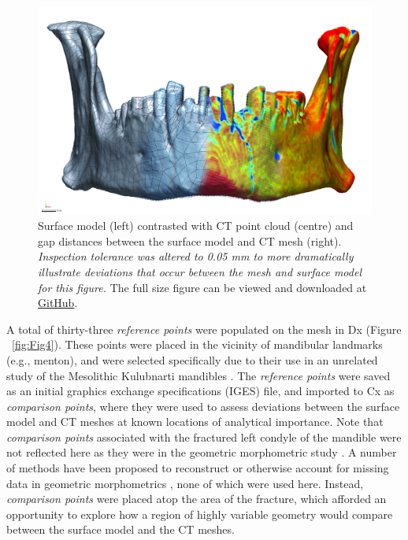 \documentclass[review]{elsarticle}
\begin{document}
\begin{figure}[ht]\centering
\includegraphics[width=\linewidth]{Fig2}
\caption{Surface model (left) contrasted with CT point cloud (centre) and gap distances between the surface model and CT mesh (right). \textit{Inspection tolerance was altered to 0.05 mm to more dramatically illustrate deviations that occur between the mesh and surface model for this figure.} The full size figure can be viewed and downloaded at \href{https://github.com/aksel-blaise/cai.mandible/blob/main/figures/Fig2.jpg}{GitHub}.}
\label{fig:Fig1x}
\end{figure}

A total of thirty-three \textit{reference points} were populated on the mesh in Dx (Figure ~\ref{fig:Fig4}). These points were placed in the vicinity of mandibular landmarks (e.g., menton), and were selected specifically due to their use in an unrelated study of the Mesolithic Kulubnarti mandibles \citep{RN11477}. The \textit{reference points} were saved as an initial graphics exchange specifications (IGES) file, and imported to Cx as \textit{comparison points}, where they were used to assess deviations between the surface model and CT meshes at known locations of analytical importance. Note that \textit{comparison points} associated with the fractured left condyle of the mandible were not reflected here as they were in the geometric morphometric study \citep{RN11477}. A number of methods have been proposed to reconstruct \citep{RN11496,RN11501} or otherwise account for missing data in geometric morphometrics \citep{RN11500,RN11497,RN11498,RN11499,RN5928}, none of which were used here. Instead, \textit{comparison points} were placed atop the area of the fracture, which afforded an opportunity to explore how a region of highly variable geometry would compare between the surface model and the CT meshes.
\end{document}

